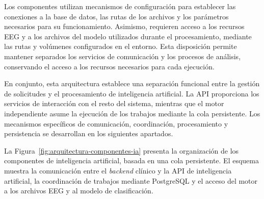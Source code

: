Los componentes utilizan mecanismos de configuración
para establecer las conexiones a la base de datos,
las rutas de los archivos y los parámetros necesarios
para su funcionamiento. Asimismo, requieren acceso
a los recursos EEG y a los archivos del modelo
utilizados durante el procesamiento, mediante
las rutas y volúmenes configurados en el entorno.
Esta disposición permite mantener separados
los servicios de comunicación y los procesos
de análisis, conservando el acceso a los
recursos necesarios para cada ejecución.

En conjunto, esta arquitectura establece una
separación funcional entre la gestión de solicitudes
y el procesamiento de inteligencia artificial.
La API proporciona los servicios de interacción
con el resto del sistema, mientras que el motor
independiente asume la ejecución de los trabajos
mediante la cola persistente. Los mecanismos
específicos de comunicación, coordinación,
procesamiento y persistencia se desarrollan
en los siguientes apartados.


La Figura~\ref{fig:arquitectura-componentes-ia}
presenta la organización de los componentes de
inteligencia artificial, basada en una cola persistente. El esquema muestra
la comunicación entre el \textit{backend} clínico y la API
de inteligencia artificial, la coordinación de
trabajos mediante PostgreSQL y el acceso del motor
a los archivos EEG y al modelo de clasificación.



